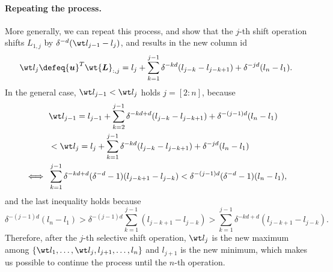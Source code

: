 \documentclass{article} %
\def\vu{{\bm{u}}}
\def\mL{{\bm{L}}}
\def\emL{{L}}
\begin{document}
\paragraph{Repeating the process.}
More generally, we can repeat this process, and show that the $j$-th shift operation shifts $\emL_{1,j}$ by $\delta^{-d} (\wt l_{j-1} - l_j)$, and results in the new column id
\begin{equation*}
    \wt l_j \defeq 
    \vu^T \wt \mL_{:,j}
    =
    l_j + \sum_{k=1}^{j-1} \delta^{-kd}(l_{j-k}-l_{j-k+1}) + \delta^{-jd} (l_n-l_1).
\end{equation*}
In the general case, $\wt l_{j-1} < \wt l_j$ holds $j = [2:n]$, because
\begin{align*}
     &\wt l_{j-1} = l_{j-1} + \sum_{k=2}^{j-1} \delta^{-kd+d}(l_{j-k}-l_{j-k+1}) + \delta^{-(j-1)d} (l_n-l_1)\\
     &< \wt l_j = l_j + \sum_{k=1}^{j-1} \delta^{-kd}(l_{j-k}-l_{j-k+1}) + \delta^{-jd} (l_n-l_1)\\
     \iff~&
     \sum_{k=1}^{j-1} \delta^{-kd+d} (\delta^{-d}-1)(l_{j-k+1}-l_{j-k}) <
     \delta^{-(j-1)d}(\delta^{-d}-1)(l_n-l_1),
\end{align*}
and the last inequality holds because
\begin{equation*}
    \delta^{-(j-1)d}(l_n-l_1) > \delta^{-(j-1)d} \sum_{k=1}^{j-1}(l_{j-k+1} - l_{j-k}) > \sum_{k=1}^{j-1} \delta^{-kd+d} (l_{j-k+1}-l_{j-k}).
\end{equation*}
Therefore, after the $j$-th selective shift operation, $\wt l_j$ is the new maximum among $\{\wt l_1, \dots, \wt l_j, l_{j+1}, \dots, l_n\}$ and $l_{j+1}$ is the new minimum, which makes us possible to continue the process until the $n$-th operation.
\end{document}
